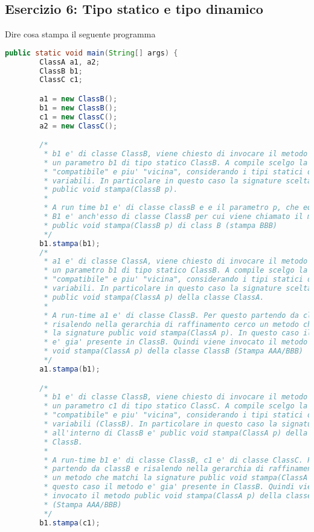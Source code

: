 \documentclass{article}
\begin{document}
\subsection{Esercizio 6: Tipo statico e tipo dinamico}
Dire cosa stampa il seguente programma 
\begin{lstlisting}[language=Java,escapechar=|]
public static void main(String[] args) {
		ClassA a1, a2;
		ClassB b1;
		ClassC c1;

		a1 = new ClassB();
		b1 = new ClassB();
		c1 = new ClassC();
		a2 = new ClassC();

		/*
		 * b1 e' di classe ClassB, viene chiesto di invocare il metodo stampa su
		 * un parametro b1 di tipo statico ClassB. A compile scelgo la signature
		 * "compatibile" e piu' "vicina", considerando i tipi statici delle
		 * variabili. In particolare in questo caso la signature scelta e'
		 * public void stampa(ClassB p).
		 * 
		 * A run time b1 e' di classe classB e e il parametro p, che equivale a
		 * B1 e' anch'esso di classe ClassB per cui viene chiamato il metodo
		 * public void stampa(ClassB p) di class B (stampa BBB)
		 */
		b1.stampa(b1);
		/*
		 * a1 e' di classe ClassA, viene chiesto di invocare il metodo stampa su
		 * un parametro b1 di tipo statico ClassB. A compile scelgo la signature
		 * "compatibile" e piu' "vicina", considerando i tipi statici delle
		 * variabili. In particolare in questo caso la signature scelta e'
		 * public void stampa(ClassA p) della classe ClassA.
		 * 
		 * A run-time a1 e' di classe ClassB. Per questo partendo da classB e
		 * risalendo nella gerarchia di raffinamento cerco un metodo che matchi
		 * la signature public void stampa(ClassA p). In questo caso il metodo
		 * e' gia' presente in ClassB. Quindi viene invocato il metodo public
		 * void stampa(ClassA p) della classe ClassB (Stampa AAA/BBB)
		 */
		a1.stampa(b1);

		/*
		 * b1 e' di classe ClassB, viene chiesto di invocare il metodo stampa su
		 * un parametro c1 di tipo statico ClassC. A compile scelgo la signature
		 * "compatibile" e piu' "vicina", considerando i tipi statici delle
		 * variabili (ClassB). In particolare in questo caso la signature scelta
		 * all'interno di ClassB e' public void stampa(ClassA p) della classe
		 * ClassB.
		 * 
		 * A run-time b1 e' di classe ClassB, c1 e' di classe ClassC. Per questo
		 * partendo da classB e risalendo nella gerarchia di raffinamento cerco
		 * un metodo che matchi la signature public void stampa(ClassA p). In
		 * questo caso il metodo e' gia' presente in ClassB. Quindi viene
		 * invocato il metodo public void stampa(ClassA p) della classe ClassB
		 * (Stampa AAA/BBB)
		 */
		b1.stampa(c1);


\end{lstlisting}
\end{document}
